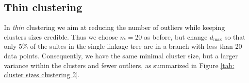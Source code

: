 \documentclass{llncs}
\begin{document}

\subsection{Thin clustering}

In \emph{thin} clustering we aim at reducing the number of outliers while keeping clusters sizes credible. Thus we choose $m=20$ as before, but change $d_{\text{max}}$ so that only $5\%$ of the suites in the single linkage tree are in a branch with less than 20 data points. Consequently, we have the same minimal cluster size, but a larger variance within the clusters and fewer outliers, as 
summarized in Figure \ref{tab: cluster sizes clustering 2}.
\end{document}
